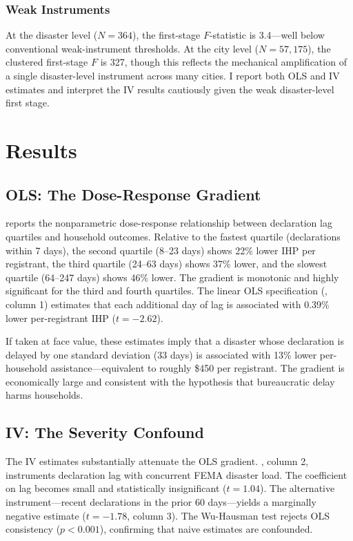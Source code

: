 \documentclass[12pt]{article}
\begin{document}
\subsubsection*{Weak Instruments} At the disaster level ($N = 364$), the first-stage $F$-statistic is 3.4---well below conventional weak-instrument thresholds. At the city level ($N = 57{,}175$), the clustered first-stage $F$ is 327, though this reflects the mechanical amplification of a single disaster-level instrument across many cities. I report both OLS and IV estimates and interpret the IV results cautiously given the weak disaster-level first stage.


\section{Results}

\subsection{OLS: The Dose-Response Gradient}

 reports the nonparametric dose-response relationship between declaration lag quartiles and household outcomes. Relative to the fastest quartile (declarations within 7 days), the second quartile (8--23 days) shows 22\% lower IHP per registrant, the third quartile (24--63 days) shows 37\% lower, and the slowest quartile (64--247 days) shows 46\% lower. The gradient is monotonic and highly significant for the third and fourth quartiles. The linear OLS specification (, column 1) estimates that each additional day of lag is associated with 0.39\% lower per-registrant IHP ($t = -2.62$).

If taken at face value, these estimates imply that a disaster whose declaration is delayed by one standard deviation (33 days) is associated with 13\% lower per-household assistance---equivalent to roughly \$450 per registrant. The gradient is economically large and consistent with the hypothesis that bureaucratic delay harms households.

\subsection{IV: The Severity Confound}

The IV estimates substantially attenuate the OLS gradient. , column 2, instruments declaration lag with concurrent FEMA disaster load. The coefficient on lag becomes small and statistically insignificant ($t = 1.04$). The alternative instrument---recent declarations in the prior 60 days---yields a marginally negative estimate ($t = -1.78$, column 3). The Wu-Hausman test rejects OLS consistency ($p < 0.001$), confirming that naive estimates are confounded.
\end{document}
